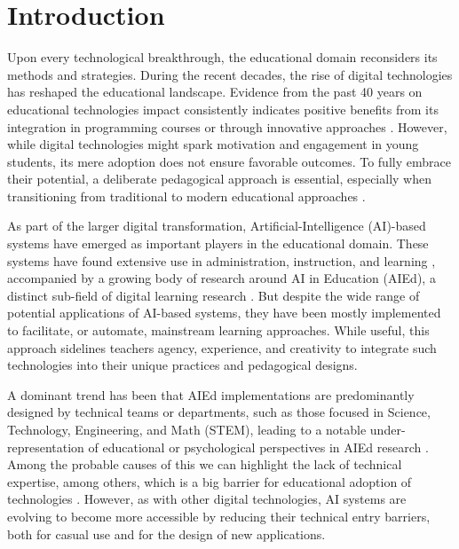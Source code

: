 \documentclass[sn-mathphys, Numbered]{sn-jnl}%
\theoremstyle{thmstyleone}%
\theoremstyle{thmstyletwo}%
\theoremstyle{thmstylethree}%
\begin{document}

\maketitle

\section{Introduction}

Upon every technological breakthrough, the educational domain reconsiders its methods and strategies. During the recent decades, the rise of digital technologies has reshaped the educational landscape. Evidence from the past 40 years on educational technologies impact consistently indicates positive benefits from its integration in programming courses or through innovative approaches \parencite{higgins_impact_2012}.  
However, while digital technologies might spark motivation and engagement in young students, its mere adoption does not ensure favorable outcomes.  To fully embrace their potential, a deliberate pedagogical approach is essential, especially when transitioning from traditional to modern educational approaches \parencite{parker_authentic_2020,khaddage_bridging_2021} . 

As part of the larger digital transformation, Artificial-Intelligence (AI)-based systems have emerged as important players in the educational domain. These systems have found extensive use in administration, instruction, and learning \parencite{chen_application_2020}, accompanied by a growing body of research around AI in Education (AIEd), a distinct sub-field of digital learning research \parencite{niemi_ai_2023}.  But despite the wide range of potential applications of AI-based systems, they have been mostly implemented to facilitate, or automate, mainstream learning approaches. While useful, this approach sidelines teachers agency, experience, and creativity to integrate such technologies into their unique practices and pedagogical designs. \parencite{holmes_artificial_2023}

A dominant trend has been that AIEd implementations are predominantly designed by technical teams or departments, such as those focused in Science, Technology, Engineering, and Math (STEM), leading to a notable under-representation of educational or psychological perspectives in AIEd research \parencite{holmes_state_2022, zawacki-richter_systematic_2019}. Among the probable causes of this we can highlight the lack of technical expertise, among others, which is a big barrier for educational adoption of technologies \parencite{reid_categories_2014}. However, as with other digital technologies, AI systems are evolving to become more accessible by reducing their technical entry barriers, both for casual use and for the design of new applications.
\end{document}

